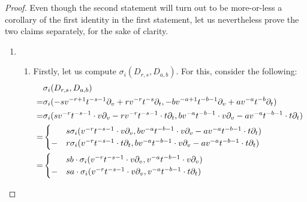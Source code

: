            \begin{proof}
                Even though the second statement will turn out to be more-or-less a corollary of the first identity in the first statement, let us nevertheless prove the two claims separately, for the sake of clarity.
                \begin{enumerate}
                    \item
                    \begin{enumerate}
                        \item Firstly, let us compute $\sigma_i(D_{r, s}, D_{a, b})$. For this, consider the following:
                            $$
                                \begin{aligned}
                                    & \sigma_i(D_{r, s}, D_{a, b})
                                    \\
                                    = & \sigma_i( -s v^{-r + 1} t^{-s - 1} \del_v + r v^{-r} t^{-s} \del_t, -b v^{-a + 1} t^{-b - 1} \del_v + a v^{-a} t^{-b} \del_t )
                                    \\
                                    = & \sigma_i( s v^{-r} t^{-s - 1} \cdot v\del_v - r v^{-r} t^{-s - 1} \cdot t \del_t, b v^{-a} t^{-b - 1} \cdot v\del_v - a v^{-a} t^{-b - 1} \cdot t \del_t )
                                    \\
                                    = &
                                    \begin{cases}
                                        & s \sigma_i( v^{-r} t^{-s - 1} \cdot v\del_v, b v^{-a} t^{-b - 1} \cdot v\del_v - a v^{-a} t^{-b - 1} \cdot t \del_t )
                                        \\
                                        - & r \sigma_i( v^{-r} t^{-s - 1} \cdot t \del_t, b v^{-a} t^{-b - 1} \cdot v\del_v - a v^{-a} t^{-b - 1} \cdot t \del_t )
                                    \end{cases}
                                    \\
                                    = &
                                    \begin{cases}
                                        & s b \cdot \sigma_i( v^{-r} t^{-s - 1} \cdot v\del_v, v^{-a} t^{-b - 1} \cdot v\del_v )
                                        \\
                                        - & s a \cdot \sigma_i( v^{-r} t^{-s - 1} \cdot v\del_v, v^{-a} t^{-b - 1} \cdot t \del_t )

\end{cases}
\end{aligned}$$
\end{enumerate}
\end{enumerate}
\end{proof}
